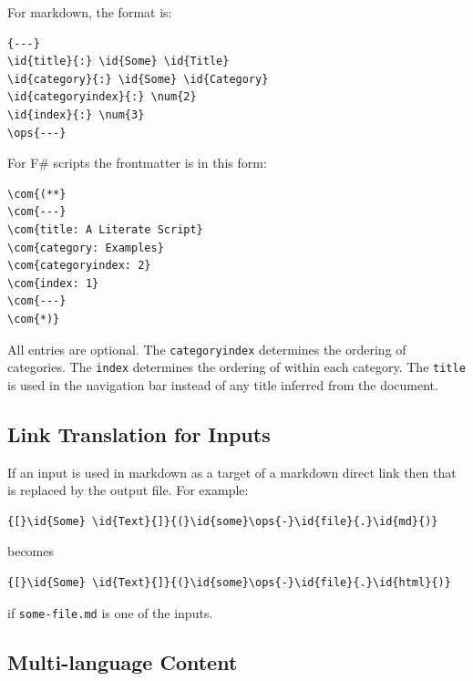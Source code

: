 \documentclass{article}
\newcommand{\id}[1]{\textcolor{black}{#1}}
\newcommand{\com}[1]{\textcolor{officegreen}{#1}}
\newcommand{\num}[1]{\textcolor{officegreen}{#1}}
\newcommand{\ops}[1]{\textcolor{purple}{#1}}
\begin{document}
For markdown, the format is:
\begin{Verbatim}[commandchars=\\\{\}]
{---}
\id{title}{:} \id{Some} \id{Title}
\id{category}{:} \id{Some} \id{Category}
\id{categoryindex}{:} \num{2}
\id{index}{:} \num{3}
\ops{---}

\end{Verbatim}



For F\# scripts the frontmatter is in this form:
\begin{Verbatim}[commandchars=\\\{\}]
\com{(**}
\com{---}
\com{title: A Literate Script}
\com{category: Examples}
\com{categoryindex: 2}
\com{index: 1}
\com{---}
\com{*)}

\end{Verbatim}



All entries are optional.
The \texttt{categoryindex} determines the ordering of categories.
The \texttt{index} determines the ordering of within each category.
The \texttt{title} is used in the navigation bar instead of any title inferred from the document.
\subsection*{Link Translation for Inputs}



If an input is used in markdown as a target of a markdown direct link then that is replaced by the output file. For example:
\begin{Verbatim}[commandchars=\\\{\}]
{[}\id{Some} \id{Text}{]}{(}\id{some}\ops{-}\id{file}{.}\id{md}{)}

\end{Verbatim}



becomes
\begin{Verbatim}[commandchars=\\\{\}]
{[}\id{Some} \id{Text}{]}{(}\id{some}\ops{-}\id{file}{.}\id{html}{)}

\end{Verbatim}



if \texttt{some-file.md} is one of the inputs.
\subsection*{Multi-language Content}
\end{document}
